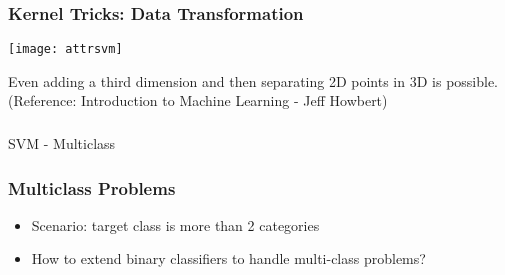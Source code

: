 \begin{frame}[fragile]\frametitle{Kernel Tricks: Data Transformation}
\begin{center}
\texttt{[image: attrsvm]}
\end{center}
Even adding a third dimension and then separating 2D points in 3D is possible.
\tiny{(Reference: Introduction to Machine Learning - Jeff Howbert)}
\end{frame}
%
%
%
%

\begin{frame}[fragile]\frametitle{}
\begin{center}
{\Large SVM - Multiclass}
\end{center}
\end{frame}


\begin{frame}[fragile]\frametitle{Multiclass Problems}
\begin{itemize}
\item Scenario: target class is more than 2 categories
\item How to extend binary classifiers to handle multi-class problems?
\end{itemize}
\end{frame}

